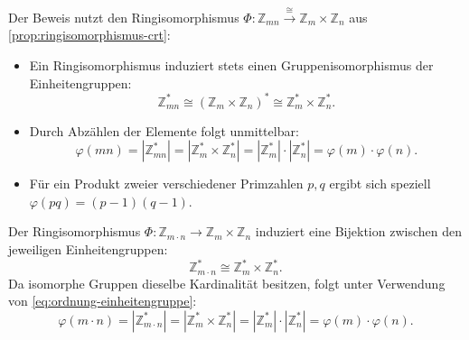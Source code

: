 \begin{math-stroke}

\begin{explanation-of-steps}
Der Beweis nutzt den Ringisomorphismus $\Phi \colon \mathbb{Z}_{mn} \stackrel{\cong}{\to} \mathbb{Z}_m \times \mathbb{Z}_n$ aus \cref{prop:ringisomorphismus-crt}:
\begin{itemize}
    \item Ein Ringisomorphismus induziert stets einen Gruppenisomorphismus der Einheitengruppen:
    \[
    \mathbb{Z}_{mn}^* \cong (\mathbb{Z}_m \times \mathbb{Z}_n)^* \cong \mathbb{Z}_m^* \times \mathbb{Z}_n^*.
    \]
    \item Durch Abzählen der Elemente folgt unmittelbar:
    \[
    \varphi(mn) = |\mathbb{Z}_{mn}^*| = |\mathbb{Z}_m^* \times \mathbb{Z}_n^*| = |\mathbb{Z}_m^*| \cdot |\mathbb{Z}_n^*| = \varphi(m) \cdot \varphi(n).
    \]
    \item Für ein Produkt zweier verschiedener Primzahlen $p, q$ ergibt sich speziell $\varphi(pq) = (p-1)(q-1)$.
\end{itemize}
\end{explanation-of-steps}

\begin{short-proof}
Der Ringisomorphismus $\Phi \colon \mathbb{Z}_{m \cdot n} \to \mathbb{Z}_m \times \mathbb{Z}_n$ induziert eine Bijektion zwischen den jeweiligen Einheitengruppen:
\[
\mathbb{Z}_{m \cdot n}^* \cong \mathbb{Z}_m^* \times \mathbb{Z}_n^*.
\]
Da isomorphe Gruppen dieselbe Kardinalität besitzen, folgt unter Verwendung von \eqref{eq:ordnung-einheitengruppe}:
\[
\varphi(m \cdot n) = |\mathbb{Z}_{m \cdot n}^*| = |\mathbb{Z}_m^* \times \mathbb{Z}_n^*| = |\mathbb{Z}_m^*| \cdot |\mathbb{Z}_n^*| = \varphi(m) \cdot \varphi(n).
\]
\end{short-proof}



\end{math-stroke}
